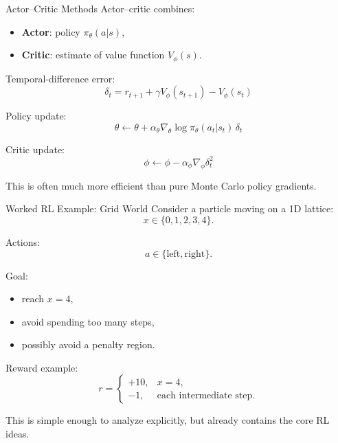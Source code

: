 \documentclass[aspectratio=169]{beamer}
\begin{document}
\begin{frame}{Actor--Critic Methods}
  Actor--critic combines:
  \begin{itemize}
  \item \textbf{Actor}: policy $\pi_\theta(a|s)$,
  \item \textbf{Critic}: estimate of value function $V_\phi(s)$.
  \end{itemize}

  Temporal-difference error:
  \[
  \delta_t=r_{t+1}+\gamma V_\phi(s_{t+1})-V_\phi(s_t)
  \]

  Policy update:
  \[
  \theta \leftarrow \theta + \alpha_\theta
  \nabla_\theta \log \pi_\theta(a_t|s_t)\,\delta_t
  \]

  Critic update:
  \[
  \phi \leftarrow \phi - \alpha_\phi \nabla_\phi \delta_t^2
  \]

  This is often much more efficient than pure Monte Carlo policy gradients.
\end{frame}

\begin{frame}{Worked RL Example: Grid World}
  Consider a particle moving on a 1D lattice:
  \[
  x \in \{0,1,2,3,4\}.
  \]

  Actions:
  \[
  a \in \{\text{left},\text{right}\}.
  \]

  Goal:
  \begin{itemize}
  \item reach $x=4$,
  \item avoid spending too many steps,
  \item possibly avoid a penalty region.
  \end{itemize}

  Reward example:
  \[
  r=
  \begin{cases}
    +10, & x=4,\\
    -1, & \text{each intermediate step}.
  \end{cases}
  \]

  This is simple enough to analyze explicitly, but already contains the core RL ideas.
\end{frame}




\end{document}
